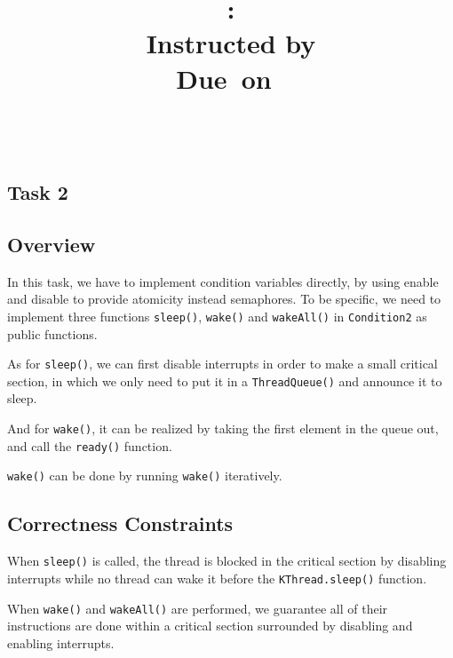 \documentclass{article}
\title{\textmd{\bf \Class: \Title}\\{\large Instructed by \textit{\ClassInstructor}}\\\normalsize\vspace{0.1in}\small{Due\ on\ \DueDate}}
\date{}
\author{\textbf{\StudentName}\ \ \StudentClass\ \ \StudentNumber}
\begin{document}
\begin{spacing}{1.1}
\maketitle \thispagestyle{empty}



\theoremstyle{plain} \newtheorem{computational}{Definition}
\section{Task 2}
\subsection{Overview}
In this task, we have to implement condition variables directly, by using enable and disable to provide atomicity instead semaphores. To be specific, we need to implement three functions \texttt{sleep()}, \texttt{wake()} and \texttt{wakeAll()} in \texttt{Condition2} as public functions.

As for \texttt{sleep()}, we can first disable interrupts in order to make a small critical section, in which we only need to put it in a \texttt{ThreadQueue()} and announce it to sleep.

And for \texttt{wake()}, it can be realized by taking the first element in the queue out, and call the \texttt{ready()} function.

\texttt{wake()} can be done by running \texttt{wake()} iteratively.
\subsection{Correctness Constraints}
\begin{asparaitem}
  \item When \texttt{sleep()} is called, the thread is blocked in the critical section by disabling interrupts while no thread can wake it before the \texttt{KThread.sleep()} function.
  \item When \texttt{wake()} and \texttt{wakeAll()} are performed, we guarantee all of their instructions are done within a critical section surrounded by disabling and enabling interrupts.
\end{asparaitem}

\end{spacing}
\end{document}
